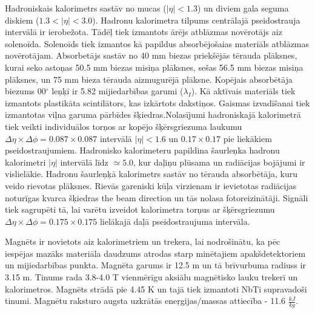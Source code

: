 Hadroniskais kalorimetrs \cite{HCAL_report} sastāv no mucas ($\left|\eta\right| < 1.3 $) un diviem gala seguma diskiem ($1.3 < \left|\eta\right| < 3.0 $). Hadronu kalorimetra tilpums centrālajā pseidostrauja intervālā ir ierobežota. Tādēļ tiek izmantots ārējs atblāzmas novērotājs aiz solenoīda. Solenoīds tiek izmantos kā papildus absorbējošaias materiāls atblāzmas novērotājam. Absorbetājs sastāv no 40 mm biezas priekšējās tērauda plāksnes, kurai seko astoņas 50.5 mm biezas misiņa plāksnes, sešas 56.5 mm biezas misiņa plāksnes, un 75 mm bieza tērauda aizmugurējā plāksne. Kopējais absorbētāja biezums 00$^{\circ}$ leņķī ir 5.82 mijiedarbības garumi ($\lambda_{I}$). Kā aktīvais materiāls tiek izmantots plastikāta scintilātors, kas izkārtots \gls{dakstiņos}. Gaismas izvadīšanai tiek izmantotas viļna garuma pārbīdes šķiedras.Nolasījumi hadroniskajā kalorimetrā tiek veikti individuālos \gls{torņos} ar kopējo šķērsgriezuma laukumu $\Delta\eta\times\Delta\phi=0.087\times0.087$ intervālā $\left|\eta\right|<1.6$ un $0.17\times0.17$ pie liekākiem pseidostraujumiem. Hadronisko kalorimeteru papildina šaurleņka hadronu kalorimetri $\left|\eta\right|$ intervālā līdz $\simeq5.0$, kur daļiņu plūsama un radiācijas bojājumi ir vislielākie. Hadronu šaurleņķā kalorimetrs sastāv no tērauda absorbētāja, kuru veido rievotas plāksnes. Rievās gareniski kūļa virzienam ir ievietotas radiācijas noturīgas kvarca šķiedras the beam direction un tās nolasa fotoreizinātāji. Signāli tiek sagrupēti tā, lai varētu izveidot kalorimetra torņus ar šķērsgriezumu $\Delta\eta\times\Delta\phi=0.175\times0.175$ lielākajā daļā pseidostraujuma intervāla. 

Magnēts ir novietots aiz kalorimetriem un trekera, lai nodrošinātu, ka pēc iespējas mazāks materiāla daudzums atrodas starp minētajiem apakšdetektoriem un mijiedarbības punkta. Magnēta garums ir 12.5 m un tā brīvurbuma radiuss ir 3.15 m. Tinums rada 3.8-4.0 T vienmērīgu aksiālu magnētisko lauku trekerī un kalorimetros. Magnēts strādā pie 4.45 K un tajā tiek izmantoti NbTi supravadoši tinumi. Magnētu raksturo augsta uzkrātās eneŗgijas/massas attiecība - 11.6 $\frac{kJ}{kg}$.

